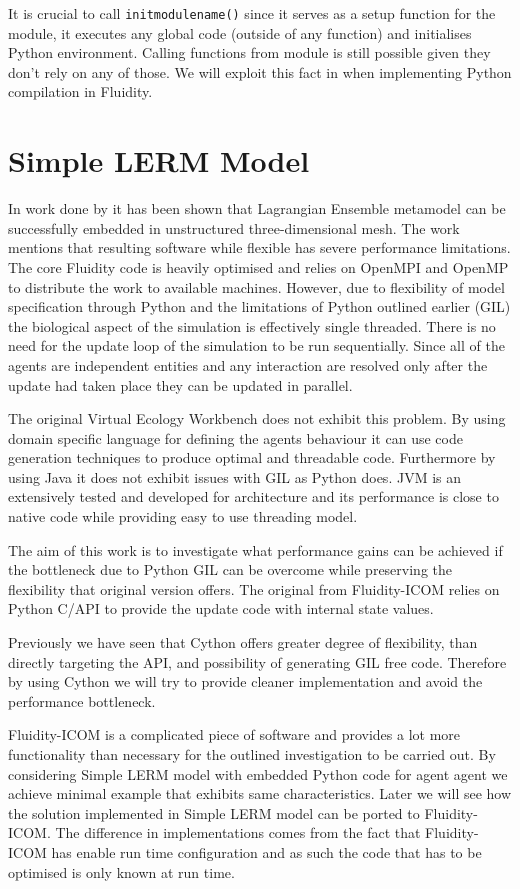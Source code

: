 \documentclass[12pt, a4paper]{report}
\begin{document}
It is crucial to call \lstinline{initmodulename()} since it serves as a setup
function for the module, it executes any global code (outside of any function)
and initialises Python environment. Calling functions from module is still
possible given they don't rely on any of those. We will exploit this fact in
when implementing Python compilation in Fluidity.

\chapter{Simple LERM Model}\label{ch:opt-simpl-lerm}
In work done by \cite{FluidityVEW} it has been shown that Lagrangian
Ensemble metamodel can be successfully embedded in unstructured
three-dimensional mesh. The work mentions that resulting software while
flexible has severe performance limitations. The core Fluidity code
is heavily optimised and relies on OpenMPI and OpenMP to distribute
the work to available machines. However, due to flexibility of model
specification through Python and the limitations of Python outlined
earlier (GIL) the biological aspect of the simulation is effectively
single threaded. There is no need for the update loop of the simulation
to be run sequentially. Since all of the agents are independent
entities and any interaction are resolved only after the update had
taken place they can be updated in parallel.

The original Virtual Ecology Workbench does not exhibit this problem.
By using domain specific language for defining the agents behaviour
it can use code generation techniques to produce optimal and threadable
code. Furthermore by using Java it does not exhibit issues with GIL
as Python does. JVM is an extensively tested and developed for architecture
and its performance is close to native code while providing easy to use
threading model.

The aim of this work is to investigate what performance gains can be
achieved if the bottleneck due to Python GIL can be overcome while
preserving the flexibility that original version offers. The original
from Fluidity-ICOM relies on Python C/API to provide the update code
with internal state values.

Previously we have seen that Cython offers greater degree of flexibility,
than directly targeting the API, and possibility of generating GIL free
code. Therefore by using Cython we will try to provide cleaner implementation
and avoid the performance bottleneck.

Fluidity-ICOM is a complicated piece of software and provides a lot more
functionality than necessary for the outlined investigation to be carried
out. By considering Simple LERM model with embedded Python code for agent
agent we achieve minimal example that exhibits same characteristics. Later
we will see how the solution implemented in Simple LERM model can be ported
to Fluidity-ICOM. The difference in implementations comes from the fact
that Fluidity-ICOM has enable run time configuration and as such the code
that has to be optimised is only known at run time.
\end{document}
